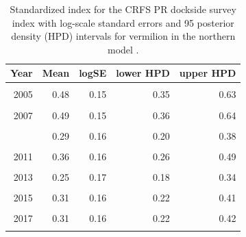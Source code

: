 \documentclass[
  english,
  a4paper,
]{article}
\begin{document}
\begin{table}

\caption{\label{tab:tab-index-crfspr}Standardized index for the CRFS PR dockside survey index with log-scale standard errors and 95%
       posterior density (HPD) intervals for vermilion in the northern model .}
\centering
\begin{tabular}[t]{rrrrr}
\toprule
Year & Mean & logSE & lower HPD & upper HPD\\
\midrule
\cellcolor{gray!6}{2004} & \cellcolor{gray!6}{0.49} & \cellcolor{gray!6}{0.14} & \cellcolor{gray!6}{0.37} & \cellcolor{gray!6}{0.63}\\
2005 & 0.48 & 0.15 & 0.35 & 0.63\\
\cellcolor{gray!6}{2006} & \cellcolor{gray!6}{0.53} & \cellcolor{gray!6}{0.15} & \cellcolor{gray!6}{0.39} & \cellcolor{gray!6}{0.69}\\
2007 & 0.49 & 0.15 & 0.36 & 0.64\\
\cellcolor{gray!6}{2008} & \cellcolor{gray!6}{0.32} & \cellcolor{gray!6}{0.16} & \cellcolor{gray!6}{0.23} & \cellcolor{gray!6}{0.44}\\
\addlinespace
2009 & 0.29 & 0.16 & 0.20 & 0.38\\
\cellcolor{gray!6}{2010} & \cellcolor{gray!6}{0.36} & \cellcolor{gray!6}{0.16} & \cellcolor{gray!6}{0.26} & \cellcolor{gray!6}{0.47}\\
2011 & 0.36 & 0.16 & 0.26 & 0.49\\
\cellcolor{gray!6}{2012} & \cellcolor{gray!6}{0.28} & \cellcolor{gray!6}{0.16} & \cellcolor{gray!6}{0.20} & \cellcolor{gray!6}{0.38}\\
2013 & 0.25 & 0.17 & 0.18 & 0.34\\
\addlinespace
\cellcolor{gray!6}{2014} & \cellcolor{gray!6}{0.26} & \cellcolor{gray!6}{0.17} & \cellcolor{gray!6}{0.19} & \cellcolor{gray!6}{0.36}\\
2015 & 0.31 & 0.16 & 0.22 & 0.41\\
\cellcolor{gray!6}{2016} & \cellcolor{gray!6}{0.33} & \cellcolor{gray!6}{0.16} & \cellcolor{gray!6}{0.24} & \cellcolor{gray!6}{0.44}\\
2017 & 0.31 & 0.16 & 0.22 & 0.42\\
\cellcolor{gray!6}{2018} & \cellcolor{gray!6}{0.38} & \cellcolor{gray!6}{0.15} & \cellcolor{gray!6}{0.28} & \cellcolor{gray!6}{0.50}\\
\bottomrule
\end{tabular}
\end{table}
\end{document}
